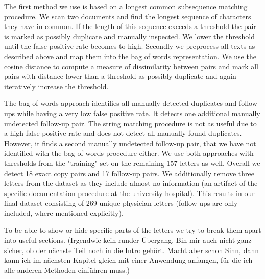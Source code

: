 The first method we use is based on a longest common subsequence matching procedure. We scan two documents and find the longest sequence of characters they have in common. If the length of this sequence exceeds a threshold the pair is marked as possibly duplicate and manually inspected. We lower the threshold until the false positive rate becomes to high. Secondly we preprocess all texts as described above and map them into the bag of words representation. We use the cosine distance to compute a measure of dissimilarity between pairs and mark all pairs with distance lower than a threshold as possibly duplicate and again iteratively increase the threshold.

The bag of words approach identifies all manually detected duplicates and follow-ups while having a very low false positive rate. It detects one additional manually undetected follow-up pair. The string matching procedure is not as useful due to a high false positive rate and does not detect all manually found duplicates. However, it finds a second manually undetected follow-up pair, that we have not identified with the bag of words procedure either. We use both approaches with thresholds from the "training" set on the remaining 157 letters as well. Overall we detect 18 exact copy pairs and 17 follow-up pairs. We additionally remove three letters from the dataset as they include almost no information (an artifact of the specific documentation procedure at the university hospital). This results in our final dataset consisting of 269 unique physician letters (follow-ups are only included, where mentioned explicitly).

To be able to show or hide specific parts of the letters we try to break them apart into useful sections. (Irgendwie kein runder Übergang. Bin mir auch nicht ganz sicher, ob der nächste Teil noch in die Intro gehört. Macht aber schon Sinn, dann kann ich im nächsten Kapitel gleich mit einer Anwendung anfangen, für die ich alle anderen Methoden einführen muss.)





